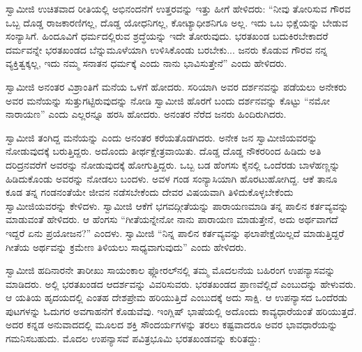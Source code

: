  ಸ್ವಾಮೀಜಿ ಉಚಿತವಾದ ರೀತಿಯಲ್ಲಿ ಅಭಿನಂದನೆಗೆ ಉತ್ತರವನ್ನು ಇತ್ತು ಹೀಗೆ ಹೇಳಿದರು: “ನೀವು ತೋರಿಸುವ ಗೌರವ ಒಬ್ಬ ದೊಡ್ಡ ರಾಜಕಾರಣಿಗಲ್ಲ, ದೊಡ್ಡ ಯೋಧನಿಗಲ್ಲ, ಕೋಟ್ಯಾಧೀಶನಿಗೂ ಅಲ್ಲ. ಇದು ಒಬ ಭಿಕ್ಷೆಯನ್ನು ಬೇಡುವ ಸಂನ್ಯಾಸಿಗೆ. ಹಿಂದೂವಿಗೆ ಧರ್ಮದಲ್ಲಿರುವ ಶ್ರದ್ಧೆಯನ್ನು ಇದೇ ತೋರುವುದು. ಭರತಖಂಡ ಬದುಕಿರಬೇಕಾದರೆ ದರ್ಮವನ್ನೇ ಭರತಖಂಡದ ಬೆನ್ನುಮೂಳೆಯಾಗಿ ಉಳಿಸಿಕೊಂಡು ಬರಬೇಕು... ಜನರು ಕೊಡುವ ಗೌರವ ನನ್ನ ವ್ಯಕ್ತಿತ್ವಕ್ಕಲ್ಲ, ಇದು ನಮ್ಮ ಸನಾತನ ಧರ್ಮಕ್ಕೆ ಎಂದು ನಾನು ಭಾವಿಸುತ್ತೇನೆ” ಎಂದು ಹೇಳಿದರು. 

 ಸ್ವಾಮೀಜಿ ಅನಂತರ ವಿಶ್ರಾಂತಿಗೆ ಮನೆಯ ಒಳಗೆ ಹೋದರು. ಸರಿಯಾಗಿ ಅವರ ದರ್ಶನವನ್ನು ಪಡೆಯಲು ಅನೇಕರು ಅವರ ಮನೆಯನ್ನು ಸುತ್ತುಗಟ್ಟಿರುವುದನ್ನು ನೋಡಿ ಸ್ವಾಮೀಜಿ ಹೊರಗೆ ಬಂದು ದರ್ಶನವನ್ನು ಕೊಟ್ಟು “ನಮೋ ನಾರಾಯಣ” ಎಂದು ಎಲ್ಲರನ್ನೂ ಹರಸಿ ಹೋದರು. ಅನಂತರ ನೆರೆದ ಜನರು ಹಿಂದಿರುಗಿದರು. 

 ಸ್ವಾಮೀಜಿ ತಂಗಿದ್ದ ಮನೆಯನ್ನು  ಎಂದು ಅನಂತರ ಕರೆಯತೊಡಗಿದರು. ಅನೇಕ ಜನ ಸ್ವಾಮೀಜಿಯವರನ್ನು ನೋಡುವುದಕ್ಕೆ ಬರುತ್ತಿದ್ದರು. ಅದೊಂದು ತೀರ್ಥಕ್ಷೇತ್ರವಾಯಿತು. ದೊಡ್ಡ ದೊಡ್ಡ ನೌಕರರಿಂದ ಹಿಡಿದು ಅತಿ ದರಿದ್ರನವರೆಗೆ ಅವರನ್ನು ನೋಡುವುದಕ್ಕೆ ಹೋಗುತ್ತಿದ್ದರು. ಒಬ್ಬ ಬಡ ಹೆಂಗಸು ಕೈನಲ್ಲಿ ಒಂದೆರಡು ಬಾಳೆಹಣ್ಣನ್ನು ಹಿಡಿದುಕೊಂಡು ಅವರನ್ನು ನೋಡಲು ಬಂದಳು. ಅವಳ ಗಂಡ ಸಂನ್ಯಾಸಿಯಾಗಿ ಹೊರಟುಹೋಗಿದ್ದ. ಆಕೆ ತಾನೂ ಕೂಡ ತನ್ನ ಗಂಡನಂತೆಯೇ ಜೀವನ ನಡೆಸಬೇಕೆಂದು ದೇವರ ವಿಷಯವಾಗಿ ತಿಳಿದುಕೊಳ್ಳಬೇಕೆಂದು ಸ್ವಾಮೀಜಿಯವರನ್ನು ಕೇಳಿದಳು. ಸ್ವಾಮೀಜಿ ಆಕೆಗೆ ಭಗವದ್ಗೀತೆಯನ್ನು ಪಾರಾಯಣಮಾಡಿ ತನ್ನ ಪಾಲಿನ ಕರ್ತವ್ಯವನ್ನು ಮಾಡುವಂತೆ ಹೇಳಿದರು. ಆ ಹೆಂಗಸು “ಗೀತೆಯನ್ನೇನೋ ನಾನು ಪಾರಾಯಣ ಮಾಡುತ್ತೇನೆ, ಅದು ಅರ್ಥವಾಗದೆ ಇದ್ದರೆ ಏನು ಪ್ರಯೋಜನ?” ಎಂದಳು. ಸ್ವಾಮೀಜಿ “ನಿನ್ನ ಪಾಲಿನ ಕರ್ತವ್ಯವನ್ನು ಫಲಾಪೇಕ್ಷೆಯಿಲ್ಲದೆ ಮಾಡುತ್ತಿದ್ದರೆ ಗೀತೆಯ ಅರ್ಥವನ್ನು ಕ್ರಮೇಣ ತಿಳಿಯಲು ಸಾಧ್ಯವಾಗುವುದು” ಎಂದು ಹೇಳಿದರು. 

 ಸ್ವಾಮೀಜಿ ಹದಿನಾರನೇ ತಾರೀಖು ಸಾಯಂಕಾಲ ಫ್ಲೋರಲ್‍ನಲ್ಲಿ ತಮ್ಮ ಮೊದಲನೆಯ ಬಹಿರಂಗ ಉಪನ್ಯಾಸವನ್ನು ಮಾಡಿದರು. ಅಲ್ಲಿ ಭರತಖಂಡದ ಆದರ್ಶವನ್ನು ವಿವರಿಸುವರು. ಭರತಖಂಡದ ಪ್ರಾಣವೆಲ್ಲಿದೆ ಎಂಬುದನ್ನು ಹೇಳುವರು. ಆ ಯತಿಯ ಹೃದಯದಲ್ಲಿ ಎಂತಹ ದೇಶಪ್ರೇಮ ಹರಿಯುತ್ತಿದೆ ಎಂಬುದಕ್ಕೆ ಅದು ಸಾಕ್ಷಿ. ಆ ಉಪನ್ಯಾಸದ ಒಂದೆರಡು ಪುಟಗಳನ್ನು ಓದುಗರ ಅವಗಾಹನೆಗೆ ಕೊಡುವೆವು. ಇಂಗ್ಲಿಷ್ ಭಾಷೆಯಲ್ಲಿ ಅದೊಂದು ಕಾವ್ಯಧಾರೆಯಂತೆ ಹರಿಯುತ್ತದೆ. ಅದರ ಕನ್ನಡ ಅನುವಾದದಲ್ಲಿ ಮೂಲದ ಶಕ್ತಿ ಸೌಂದರ್ಯಗಳನ್ನು ತರಲು ಕಷ್ಟವಾದರೂ ಅವರ ಭಾವಧಾರೆಯನ್ನು ಗಮನಿಸಬಹುದು. ಮೊದಲ ಉಪನ್ಯಾಸವೆ ಪವಿತ್ರಭೂಮಿ ಭರತಖಂಡವನ್ನು ಕುರಿತದ್ದು: 

